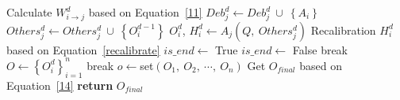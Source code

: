 \begin{algorithm*}
\begin{algorithmic}[1]
                            \STATE Calculate $W_{i\to j}^{d}$ based on Equation~\eqref{11}
                                \STATE $Deb_{j}^{d}\gets Deb_{j}^{d} \ \cup \ \left \{A_{i}  \right \} $
                                \STATE $Others_{j}^{d}\gets Others_{j}^{d} \ \cup \ \left \{O_{i}^{d-1}  \right \} $
                            \ENDIF
                        \ENDIF
                    \ENDFOR
                    \STATE $O_{i}^{d}$, $H_{i}^{d} \gets A_{j}\left (Q, \ Others_{j}^{d} \right )$  \textcolor{blue}{}
                    \STATE Recalibration $H_{i}^{d}$ based on Equation~\eqref{recalibrate}
                \ENDFOR
                \STATE $is\_end \gets$ True    \textcolor{blue}{}
                        \STATE $is\_end \gets$ False
                        \STATE break
                    \ENDIF
                \ENDFOR
                \STATE $O \gets \left \{ O_{i}^{d} \right \}_{i=1}^{n} $
                    \STATE break
                \ENDIF
            \ENDFOR
            \STATE $o \gets$set$\left ( O_{1}, \ O_{2}, \ \cdots, \ O_{n} \right )$
            \STATE Get $O_{final}$ based on Equation~\eqref{14}   \textcolor{blue}{}
		\STATE \textbf{return} $O_{final}$
	\end{algorithmic}
\end{algorithm*}